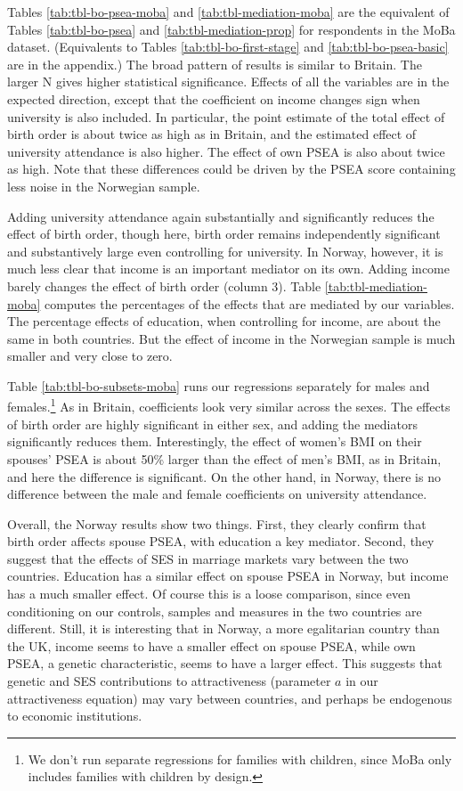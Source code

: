 \documentclass[
  12pt,
]{article}
\theoremstyle{definition}
\theoremstyle{definition}
\theoremstyle{definition}
\theoremstyle{definition}
\theoremstyle{remark}
\begin{document}
Tables \ref{tab:tbl-bo-psea-moba} and \ref{tab:tbl-mediation-moba} are
the equivalent of Tables \ref{tab:tbl-bo-psea} and
\ref{tab:tbl-mediation-prop} for respondents in the MoBa dataset.
(Equivalents to Tables \ref{tab:tbl-bo-first-stage} and
\ref{tab:tbl-bo-psea-basic} are in the appendix.) The broad pattern of
results is similar to Britain. The larger N gives higher statistical
significance. Effects of all the variables are in the expected
direction, except that the coefficient on income changes sign when
university is also included. In particular, the point estimate of the
total effect of birth order is about twice as high as in Britain, and
the estimated effect of university attendance is also higher. The effect
of own PSEA is also about twice as high. Note that these differences
could be driven by the PSEA score containing less noise in the Norwegian
sample.

Adding university attendance again substantially and significantly
reduces the effect of birth order, though here, birth order remains
independently significant and substantively large even controlling for
university. In Norway, however, it is much less clear that income is an
important mediator on its own. Adding income barely changes the effect
of birth order (column 3). Table \ref{tab:tbl-mediation-moba} computes
the percentages of the effects that are mediated by our variables. The
percentage effects of education, when controlling for income, are about
the same in both countries. But the effect of income in the Norwegian
sample is much smaller and very close to zero.

Table \ref{tab:tbl-bo-subsets-moba} runs our regressions separately for
males and females.\footnote{We don't run separate regressions for families with children,
  since MoBa only includes families with children by design.} As in Britain, coefficients look very similar
across the sexes. The effects of birth order are highly significant in
either sex, and adding the mediators significantly reduces them.
Interestingly, the effect of women's BMI on their spouses' PSEA is about
50\% larger than the effect of men's BMI, as in Britain, and here the
difference is significant. On the other hand, in Norway, there is no
difference between the male and female coefficients on university
attendance.

Overall, the Norway results show two things. First, they clearly confirm
that birth order affects spouse PSEA, with education a key mediator.
Second, they suggest that the effects of SES in marriage markets vary
between the two countries. Education has a similar effect on spouse PSEA
in Norway, but income has a much smaller effect. Of course this is a
loose comparison, since even conditioning on our controls, samples and
measures in the two countries are different. Still, it is interesting
that in Norway, a more egalitarian country than the UK, income seems to
have a smaller effect on spouse PSEA, while own PSEA, a genetic
characteristic, seems to have a larger effect. This suggests that
genetic and SES contributions to attractiveness (parameter \(a\) in our
attractiveness equation) may vary between countries, and perhaps be
endogenous to economic institutions.
\end{document}
